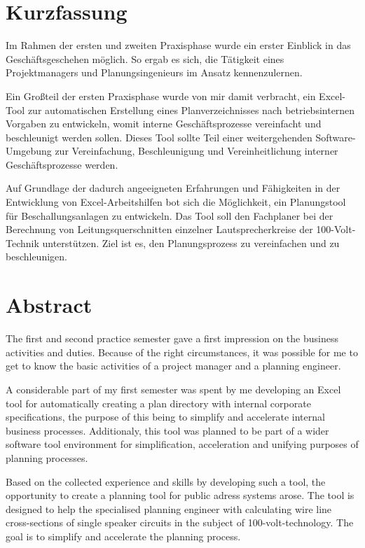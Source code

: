 \chapter*{Kurzfassung} %
\label{cha:abstract_ger}
Im Rahmen der ersten und zweiten Praxisphase wurde ein erster Einblick in das Geschäftsgeschehen möglich. So ergab es sich, die Tätigkeit eines Projektmanagers und Planungsingenieurs im Ansatz kennenzulernen. 

Ein Großteil der ersten Praxisphase wurde von mir damit verbracht, ein Excel-Tool zur automatischen Erstellung eines Planverzeichnisses nach betriebsinternen Vorgaben zu entwickeln, womit interne Geschäftsprozesse vereinfacht und beschleunigt werden sollen. Dieses Tool sollte Teil einer weitergehenden Software-Umgebung zur Vereinfachung, Beschleunigung und Vereinheitlichung interner Geschäftsprozesse werden.

Auf Grundlage der dadurch angeeigneten Erfahrungen und Fähigkeiten in der Entwicklung von Excel-Arbeitshilfen bot sich die Möglichkeit, ein Planungstool für Beschallungsanlagen zu entwickeln. Das Tool soll den Fachplaner bei der Berechnung von Leitungsquerschnitten einzelner Lautsprecherkreise der 100-Volt-Technik unterstützen. Ziel ist es, den Planungsprozess zu vereinfachen und zu beschleunigen.

\chapter*{Abstract}
\label{cha:abstract_eng}
The first and second practice semester gave a first impression on the business activities and duties. Because of the right circumstances, it was possible for me to get to know the basic activities of a project manager and a planning engineer.

A considerable part of my first semester was spent by me developing an Excel tool for automatically creating a plan directory with internal corporate specifications, the purpose of this being to simplify and accelerate internal business processes. Additionaly, this tool was planned to be part of a wider software tool environment for simplification, acceleration and unifying purposes of planning processes.

Based on the collected experience and skills by developing such a tool, the opportunity to create a planning tool for public adress systems arose. The tool is designed to help the specialised planning engineer with calculating wire line cross-sections of single speaker circuits in the subject of 100-volt-technology. The goal is to simplify and accelerate the planning process.

\cleardoublepage
